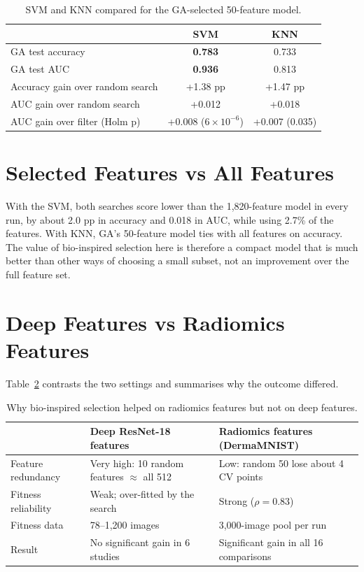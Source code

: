 \documentclass[12pt,a4paper]{report}
\begin{document}
\begin{table}[H]
\centering
\caption{SVM and KNN compared for the GA-selected 50-feature model.}
\label{tab:svmknn}
\small
\begin{tabular}{|l|c|c|}
\hline
 & \textbf{SVM} & \textbf{KNN} \\
\hline
GA test accuracy & \textbf{0.783} & 0.733 \\
\hline
GA test AUC & \textbf{0.936} & 0.813 \\
\hline
Accuracy gain over random search & +1.38 pp & +1.47 pp \\
\hline
AUC gain over random search & +0.012 & +0.018 \\
\hline
AUC gain over filter (Holm p) & +0.008 ($6\times10^{-6}$) & +0.007 (0.035) \\
\hline
\end{tabular}
\end{table}

\section{Selected Features vs All Features}
With the SVM, both searches score lower than the 1,820-feature model in every run, by about 2.0 pp in accuracy and
0.018 in AUC, while using 2.7\% of the features. With KNN, GA's 50-feature model ties with all features on accuracy.
The value of bio-inspired selection here is therefore a compact model that is much better than other ways of
choosing a small subset, not an improvement over the full feature set.

\section{Deep Features vs Radiomics Features}
Table~\ref{tab:settings} contrasts the two settings and summarises why the outcome differed.

\begin{table}[H]
\centering
\caption{Why bio-inspired selection helped on radiomics features but not on deep features.}
\label{tab:settings}
\small
\begin{tabularx}{\textwidth}{|l|X|X|}
\hline
 & \textbf{Deep ResNet-18 features} & \textbf{Radiomics features (DermaMNIST)} \\
\hline
Feature redundancy & Very high: 10 random features $\approx$ all 512 & Low: random 50 lose about 4 CV points \\
\hline
Fitness reliability & Weak; over-fitted by the search & Strong ($\rho = 0.83$) \\
\hline
Fitness data & 78--1,200 images & 3,000-image pool per run \\
\hline
Result & No significant gain in 6 studies & Significant gain in all 16 comparisons \\
\hline
\end{tabularx}
\end{table}
\end{document}
